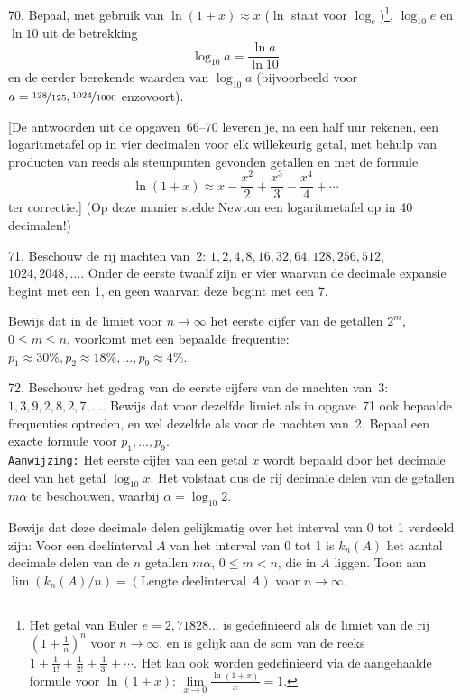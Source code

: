 \begin{problem}{70.}
	Bepaal, met gebruik van $\ln (1 + x) \approx x$ ($\ln$ staat voor $\log_e$)\footnote{Het getal van Euler $e = 2{,}71828 \dots$ is gedefinieerd als de limiet van de rij ${\left( 1 + \frac{1}{n} \right)}^n$ voor $n \to \infty$, en is gelijk aan de som van de reeks $1 + \frac{1}{1!} + \frac{1}{2!} + \frac{1}{3!} + \dotsb$. Het kan ook worden gedefinieerd via de aangehaalde formule voor $\ln (1 + x)$: $\lim\limits_{x \to 0} \frac{\ln (1 + x)}{x} = 1$.}, $\log_{10} e$ en $\ln 10$ uit de betrekking
	\begin{equation*}
		\log_{10} a = \frac{\ln a}{\ln 10}
	\end{equation*}
	en de eerder berekende waarden van $\log_{10} a$ (bijvoorbeeld voor $a = \nicefrac{128}{125},\nicefrac{1024}{1000}$ enzovoort).

	[De antwoorden uit de opgaven~66--70 leveren je, na een half uur rekenen, een logaritmetafel op in vier decimalen voor elk willekeurig getal, met behulp van producten van reeds als steunpunten gevonden getallen en met de formule
	\begin{equation*}
		\ln (1 + x) \approx x - \frac{x^2}{2} + \frac{x^3}{3} - \frac{x^4}{4} + \dotsb
	\end{equation*}
	ter correctie.] (Op deze manier stelde Newton een logaritmetafel op in 40 decimalen!)
\end{problem}

\begin{problem}{71.}
	Beschouw de rij machten van~2: $1,2,4,8,16,32,64,128,256,512,$\\$1024,2048,\dotsc$. Onder de eerste twaalf zijn er vier waarvan de decimale expansie begint met een 1, en geen waarvan deze begint met een 7.

	Bewijs dat in de limiet voor $n \to \infty$ het eerste cijfer van de getallen $2^m$, $0 \leqslant m \leqslant n$, voorkomt met een bepaalde frequentie: $p_1 \approx 30\%,p_2 \approx 18\%,\dotsc,p_9 \approx 4\%$.
\end{problem}

\begin{problem}{72.}
	Beschouw het gedrag van de eerste cijfers van de machten van~3: $1,3,9,2,8,2,7,\dotsc$. Bewijs dat voor dezelfde limiet als in opgave~71 ook bepaalde frequenties optreden, en wel dezelfde als voor de machten van~2. Bepaal een exacte formule voor $p_1,\dotsc,p_9$.\\

\noindent \texttt{Aanwijzing:} Het eerste cijfer van een getal $x$ wordt bepaald door het decimale deel van het getal $\log_{10} x$. Het volstaat dus de rij decimale delen van de getallen $m \alpha$ te beschouwen, waarbij $\alpha = \log_{10} 2$.

	Bewijs dat deze decimale delen gelijkmatig over het interval van 0 tot 1 verdeeld zijn: Voor een deelinterval $A$ van het interval van 0 tot 1 is $k_n(A)$ het aantal decimale delen van de $n$ getallen $m \alpha$, $0 \leqslant m < n$, die in $A$ liggen. Toon aan $\lim (k_n(A) / n) = (\text{Lengte deelinterval }A)$ voor $n \rightarrow \infty$.
\end{problem}

